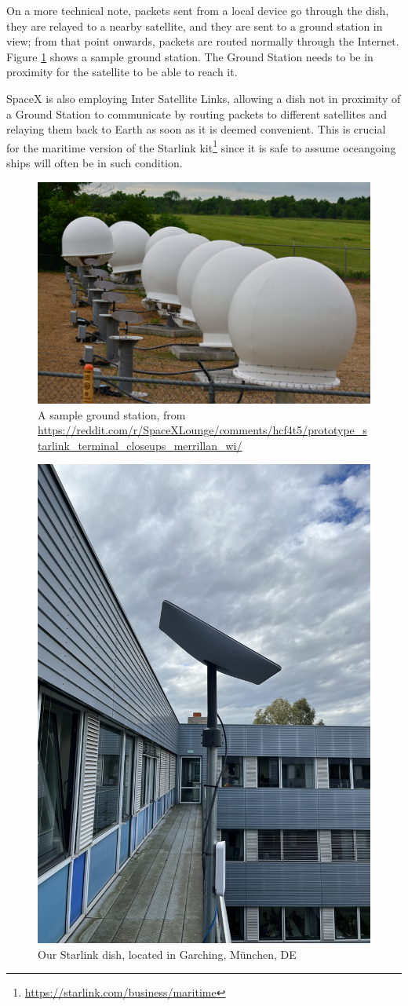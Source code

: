 \documentclass[IN,11pt,twoside,openright,idp,english]{tumthesis}
\begin{document}
On a more technical note, packets sent from a local device go through the dish, they are relayed to a nearby satellite, and they are sent to a ground station in view; from that point onwards, packets are routed normally through the Internet. Figure \ref{fig:gs} shows a sample ground station. The Ground Station needs to be in proximity for the satellite to be able to reach it.   
    
SpaceX is also employing Inter Satellite Links, allowing a dish not in proximity of a Ground Station to communicate by routing packets to different satellites and relaying them back to Earth as soon as it is deemed convenient. This is crucial for the maritime version of the Starlink kit\footnote{\url{https://starlink.com/business/maritime}} since it is safe to assume oceangoing ships will often be in such condition.
   
\begin{figure}
    \centering
    \includegraphics[width=0.6\columnwidth]{img/ground-station.jpeg}
    \caption{A sample ground station, from \small\protect\url{https://reddit.com/r/SpaceXLounge/comments/hcf4t5/prototype_starlink_terminal_closeups_merrillan_wi/}}
    \label{fig:gs}
\end{figure}
    
\begin{figure}
    \centering
    \includegraphics[width=0.6\columnwidth]{img/dish.jpeg}
    \caption{Our Starlink dish, located in Garching, München, DE}
    \label{fig:dish}
\end{figure}
    
\end{document}
